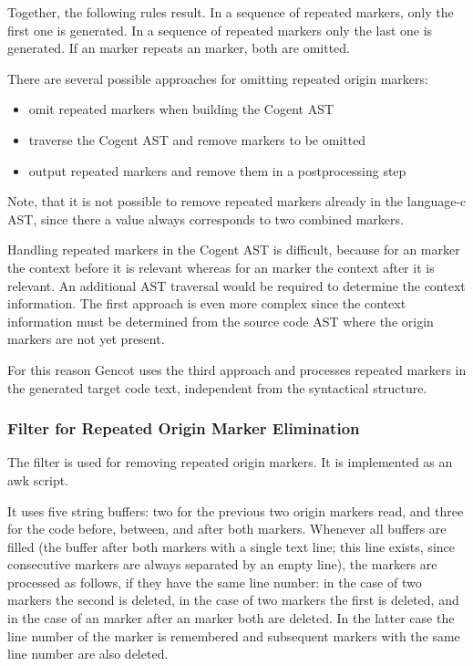 Together, the following rules result. In a sequence of repeated  markers, only the first one 
is generated. In a sequence of repeated  markers only the last one is generated.
If an  marker repeats an  marker, both are omitted.

There are several possible approaches for omitting repeated origin markers:
\begin{itemize}
\item omit repeated markers when building the Cogent AST
\item traverse the Cogent AST and remove markers to be omitted
\item output repeated markers and remove them in a postprocessing step
\end{itemize}
Note, that it is not possible to remove repeated markers already in the language-c AST, since there a 
value always corresponds to two combined markers.

Handling repeated markers in the Cogent AST is difficult, because for an  marker the context
before it is relevant whereas for an  marker the context after it is relevant. An additional
AST traversal would be required to determine the context information. The first approach is even more complex
since the context information must be determined from the source code AST where the origin markers are not
yet present. 

For this reason Gencot uses the third approach and processes repeated markers in the generated target code text,
independent from the syntactical structure.

\subsubsection{Filter for Repeated Origin Marker Elimination}

The filter  is used for removing repeated origin markers. It is implemented as an awk script.

It uses five string buffers: two for the previous two origin markers read, and three for the code before,
between, and after both markers. Whenever all buffers are filled (the buffer after both markers with a 
single text line; this line exists, since consecutive markers are always separated by an empty line),
the markers are processed as follows, if they have the same line number: in the case of two 
 markers the second is deleted, in the
case of two  markers the first is deleted, and in the case of an 
marker after an  marker both are deleted. In the latter case the line number of the
 marker is remembered and subsequent  markers with the same line number
are also deleted.

